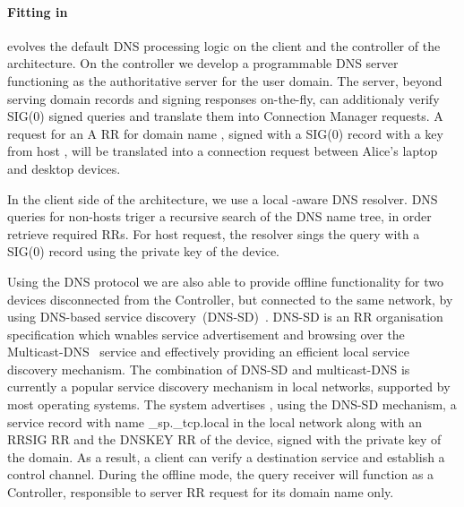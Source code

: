 
\paragraph{Fitting \dnssec in \signpost} 

\signpost evolves the default DNS processing logic on the client and the
controller of the architecture. On the controller we develop a programmable DNS
server functioning as the authoritative server for the user domain. The server,
beyond serving domain records and signing responses on-the-fly, can additionaly
verify SIG(0) signed queries and translate them into Connection Manager
requests. A request for an A RR for domain name , signed with
a SIG(0) record with a key from host , will be translated
into a connection request between Alice's laptop and desktop devices.  

In the client side of the \signpost architecture, we use a local \signpost-aware
DNS resolver. DNS queries for non-\signpost hosts triger a recursive search of
the DNS name tree, in order retrieve required RRs.  For \signpost host request,
the resolver sings the query with a SIG(0) record using the private key of the
device. 

Using the DNS protocol we are also able to provide offline functionality for two
devices disconnected from the \signpost Controller, but connected to the same
network, by using DNS-based service discovery~(DNS-SD)~\cite{RFC6763}.  DNS-SD
is an RR organisation specification which wnables service advertisement and browsing
over the Multicast-DNS~\cite{RFC6762} service and effectively providing an efficient
local service discovery mechanism. The combination of DNS-SD and multicast-DNS
is currently a popular service discovery mechanism in local networks,
supported by most operating systems.  The \signpost system 
advertises , using the DNS-SD mechanism, a \signpost service record with name
\_sp.\_tcp.local in the local network along with an RRSIG RR and the DNSKEY RR of the device, signed with the
private key of the domain. As a result, a \signpost client can
verify a destination \signpost service and establish a control channel. 
During the offline  mode, the query receiver will function as a
\signpost Controller, responsible to server RR request for its domain name only. 

